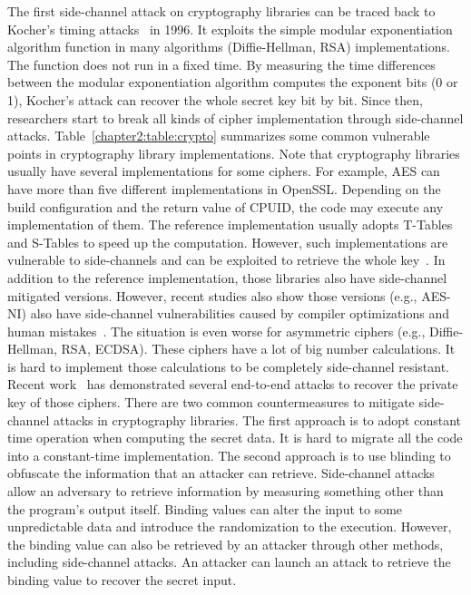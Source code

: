 The first side-channel attack on cryptography libraries can be traced back to Kocher's timing attacks~\cite{kocher1996timing} in 1996. It exploits the simple modular exponentiation algorithm function in many algorithms (Diffie-Hellman, RSA) implementations. The function does not run in a fixed time. By measuring the time differences between the modular exponentiation algorithm computes the exponent bits (0 or 1), Kocher's attack can recover the whole secret key bit by bit. Since then, researchers start to break all kinds of cipher implementation through side-channel attacks.  Table~\ref{chapter2:table:crypto} summarizes some common vulnerable points in cryptography library implementations.  Note that cryptography libraries usually have several implementations for some ciphers.
For example, AES can have more than five different implementations in OpenSSL. Depending on the build configuration and the return value of \textsf{CPUID}, the code may execute any implementation of them. The reference implementation usually adopts T-Tables and S-Tables to speed up the computation. However, such implementations are vulnerable to side-channels and can be exploited to retrieve the whole key~\cite{bonneau2006cache}. In addition to the reference implementation, those libraries also have side-channel mitigated versions. However, recent studies also show those versions (e.g., AES-NI) also have side-channel vulnerabilities caused by compiler optimizations and human mistakes~\cite{217537}. The situation is even worse for asymmetric ciphers (e.g., Diffie-Hellman, RSA, ECDSA). These ciphers have a lot of big number calculations. It is hard to implement those calculations to be completely side-channel resistant. Recent work~\cite{arnaud2013timing,yarom2017cachebleed,yarom2014flush+} has demonstrated several end-to-end attacks to recover the private key of those ciphers. There are two common countermeasures to mitigate side-channel attacks in cryptography libraries. The first approach is to adopt constant time operation when computing the secret data.  It is hard to migrate all the code into a constant-time implementation. The second approach is to use blinding to obfuscate the information that an attacker can retrieve. Side-channel attacks allow an adversary to retrieve information by measuring something other than the program's output itself. Binding values can alter the input to some unpredictable data and introduce the randomization to the execution. However, the binding value can also be retrieved by an attacker through other methods, including side-channel attacks. An attacker can launch an attack to retrieve the binding value to recover the secret input.

